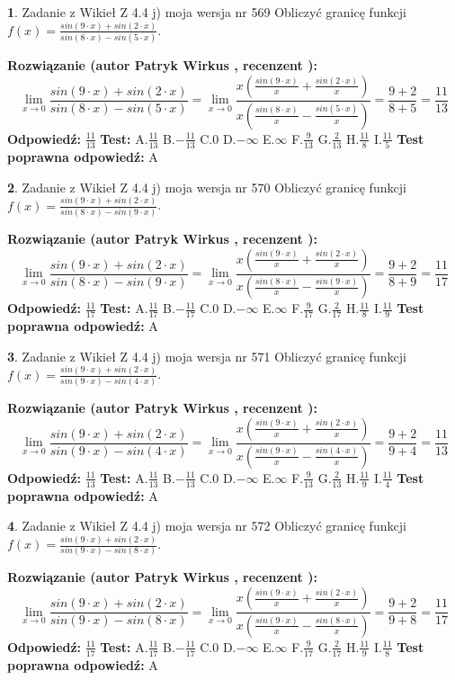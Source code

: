 \documentclass[12pt, a4paper]{article}
\theoremstyle{definition} %
\newtheorem{zad}{}
\newcommand{\zadStart}[1]{\begin{zad}#1\newline}
\newcommand{\zadStop}{\end{zad}}
\newcommand{\rozwStart}[2]{\noindent \textbf{Rozwiązanie (autor #1 , recenzent #2): }\newline}
\newcommand{\rozwStop}{\newline}
\newcommand{\odpStart}{\noindent \textbf{Odpowiedź:}\newline}
\newcommand{\odpStop}{\newline}
\newcommand{\testStart}{\noindent \textbf{Test:}\newline}
\newcommand{\testStop}{\newline}
\newcommand{\kluczStart}{\noindent \textbf{Test poprawna odpowiedź:}\newline}
\newcommand{\kluczStop}{\newline}
\begin{document}
\zadStart{Zadanie z Wikieł Z 4.4 j) moja wersja nr 569}
Obliczyć granicę funkcji $f(x)=\frac{sin(9\cdot x) +sin(2\cdot x)}{sin(8\cdot x) -sin(5\cdot x)}$.
\zadStop
\rozwStart{Patryk Wirkus}{}
$$\lim\limits_{x\to 0}\frac{sin(9\cdot x) +sin(2\cdot x)}{sin(8\cdot x) -sin(5\cdot x)}=\lim\limits_{x\to 0}\frac{x(\frac{sin(9\cdot x)}{x}+\frac{sin(2\cdot x)}{x})}{x(\frac{sin(8\cdot x)}{x}-\frac{sin(5\cdot x)}{x})}=\frac{9+2}{8+5} = \frac{11}{13}$$
\rozwStop
\odpStart
$\frac{11}{13}$
\odpStop
\testStart
A.$\frac{11}{13}$
B.$-\frac{11}{13}$
C.$0$
D.$-\infty$
E.$\infty$
F.$\frac{9}{13}$
G.$\frac{2}{13}$
H.$\frac{11}{8}$
I.$\frac{11}{5}$
\testStop
\kluczStart
A
\kluczStop



\zadStart{Zadanie z Wikieł Z 4.4 j) moja wersja nr 570}
Obliczyć granicę funkcji $f(x)=\frac{sin(9\cdot x) +sin(2\cdot x)}{sin(8\cdot x) -sin(9\cdot x)}$.
\zadStop
\rozwStart{Patryk Wirkus}{}
$$\lim\limits_{x\to 0}\frac{sin(9\cdot x) +sin(2\cdot x)}{sin(8\cdot x) -sin(9\cdot x)}=\lim\limits_{x\to 0}\frac{x(\frac{sin(9\cdot x)}{x}+\frac{sin(2\cdot x)}{x})}{x(\frac{sin(8\cdot x)}{x}-\frac{sin(9\cdot x)}{x})}=\frac{9+2}{8+9} = \frac{11}{17}$$
\rozwStop
\odpStart
$\frac{11}{17}$
\odpStop
\testStart
A.$\frac{11}{17}$
B.$-\frac{11}{17}$
C.$0$
D.$-\infty$
E.$\infty$
F.$\frac{9}{17}$
G.$\frac{2}{17}$
H.$\frac{11}{8}$
I.$\frac{11}{9}$
\testStop
\kluczStart
A
\kluczStop



\zadStart{Zadanie z Wikieł Z 4.4 j) moja wersja nr 571}
Obliczyć granicę funkcji $f(x)=\frac{sin(9\cdot x) +sin(2\cdot x)}{sin(9\cdot x) -sin(4\cdot x)}$.
\zadStop
\rozwStart{Patryk Wirkus}{}
$$\lim\limits_{x\to 0}\frac{sin(9\cdot x) +sin(2\cdot x)}{sin(9\cdot x) -sin(4\cdot x)}=\lim\limits_{x\to 0}\frac{x(\frac{sin(9\cdot x)}{x}+\frac{sin(2\cdot x)}{x})}{x(\frac{sin(9\cdot x)}{x}-\frac{sin(4\cdot x)}{x})}=\frac{9+2}{9+4} = \frac{11}{13}$$
\rozwStop
\odpStart
$\frac{11}{13}$
\odpStop
\testStart
A.$\frac{11}{13}$
B.$-\frac{11}{13}$
C.$0$
D.$-\infty$
E.$\infty$
F.$\frac{9}{13}$
G.$\frac{2}{13}$
H.$\frac{11}{9}$
I.$\frac{11}{4}$
\testStop
\kluczStart
A
\kluczStop



\zadStart{Zadanie z Wikieł Z 4.4 j) moja wersja nr 572}
Obliczyć granicę funkcji $f(x)=\frac{sin(9\cdot x) +sin(2\cdot x)}{sin(9\cdot x) -sin(8\cdot x)}$.
\zadStop
\rozwStart{Patryk Wirkus}{}
$$\lim\limits_{x\to 0}\frac{sin(9\cdot x) +sin(2\cdot x)}{sin(9\cdot x) -sin(8\cdot x)}=\lim\limits_{x\to 0}\frac{x(\frac{sin(9\cdot x)}{x}+\frac{sin(2\cdot x)}{x})}{x(\frac{sin(9\cdot x)}{x}-\frac{sin(8\cdot x)}{x})}=\frac{9+2}{9+8} = \frac{11}{17}$$
\rozwStop
\odpStart
$\frac{11}{17}$
\odpStop
\testStart
A.$\frac{11}{17}$
B.$-\frac{11}{17}$
C.$0$
D.$-\infty$
E.$\infty$
F.$\frac{9}{17}$
G.$\frac{2}{17}$
H.$\frac{11}{9}$
I.$\frac{11}{8}$
\testStop
\kluczStart
A
\kluczStop
\end{document}
